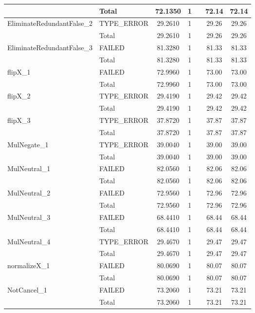 \begin{appendices}
\begin{longtable}{L{0.25\textwidth} L{0.2\textwidth}  c  c  c  c  c }
    & Total & 72.1350 & 1 &  & 72.14 & 72.14 \\ \midrule 
    EliminateRedundantFalse\_2 & TYPE\_ERROR & 29.2610 & 1 &  & 29.26 & 29.26 \\ \midrule 
    & Total & 29.2610 & 1 &  & 29.26 & 29.26 \\ \midrule 
    EliminateRedundantFalse\_3 & FAILED & 81.3280 & 1 &  & 81.33 & 81.33 \\ \midrule 
    & Total & 81.3280 & 1 &  & 81.33 & 81.33 \\ \midrule 
    flipX\_1 & FAILED & 72.9960 & 1 &  & 73.00 & 73.00 \\ \midrule 
    & Total & 72.9960 & 1 &  & 73.00 & 73.00 \\ \midrule 
    flipX\_2 & TYPE\_ERROR & 29.4190 & 1 &  & 29.42 & 29.42 \\ \midrule 
    & Total & 29.4190 & 1 &  & 29.42 & 29.42 \\ \midrule 
    flipX\_3 & TYPE\_ERROR & 37.8720 & 1 &  & 37.87 & 37.87 \\ \midrule 
    & Total & 37.8720 & 1 &  & 37.87 & 37.87 \\ \midrule 
    MulNegate\_1 & TYPE\_ERROR & 39.0040 & 1 &  & 39.00 & 39.00 \\ \midrule 
    & Total & 39.0040 & 1 &  & 39.00 & 39.00 \\ \midrule 
    MulNeutral\_1 & FAILED & 82.0560 & 1 &  & 82.06 & 82.06 \\ \midrule 
    & Total & 82.0560 & 1 &  & 82.06 & 82.06 \\ \midrule 
    MulNeutral\_2 & FAILED & 72.9560 & 1 &  & 72.96 & 72.96 \\ \midrule 
    & Total & 72.9560 & 1 &  & 72.96 & 72.96 \\ \midrule 
    MulNeutral\_3 & FAILED & 68.4410 & 1 &  & 68.44 & 68.44 \\ \midrule 
    & Total & 68.4410 & 1 &  & 68.44 & 68.44 \\ \midrule 
    MulNeutral\_4 & TYPE\_ERROR & 29.4670 & 1 &  & 29.47 & 29.47 \\ \midrule 
    & Total & 29.4670 & 1 &  & 29.47 & 29.47 \\ \midrule 
    normalizeX\_1 & FAILED & 80.0690 & 1 &  & 80.07 & 80.07 \\ \midrule 
    & Total & 80.0690 & 1 &  & 80.07 & 80.07 \\ \midrule 
    NotCancel\_1 & FAILED & 73.2060 & 1 &  & 73.21 & 73.21 \\ \midrule 
    & Total & 73.2060 & 1 &  & 73.21 & 73.21 \\ \midrule 

\end{longtable}
\end{appendices}
